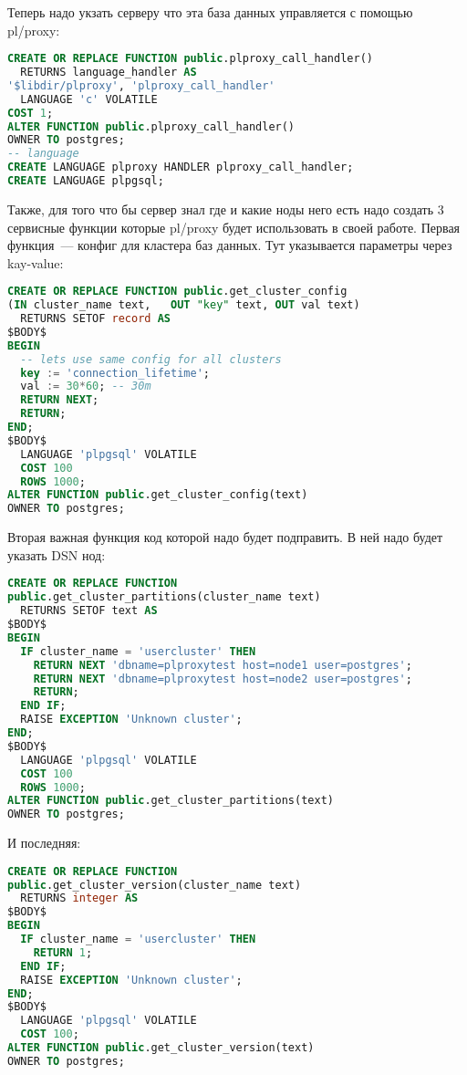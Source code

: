 Теперь надо укзать серверу что эта база данных управляется с помощью pl/proxy:
\begin{lstlisting}[language=SQL,label=lst:plproxy6,caption=Настройка]
CREATE OR REPLACE FUNCTION public.plproxy_call_handler()
  RETURNS language_handler AS
'$libdir/plproxy', 'plproxy_call_handler'
  LANGUAGE 'c' VOLATILE
COST 1;
ALTER FUNCTION public.plproxy_call_handler() 
OWNER TO postgres;
-- language
CREATE LANGUAGE plproxy HANDLER plproxy_call_handler;
CREATE LANGUAGE plpgsql;
\end{lstlisting}

Также, для того что бы сервер знал где и какие ноды него есть надо создать 
3 сервисные функции которые pl/proxy будет использовать в своей работе. 
Первая функция~--- конфиг для кластера баз данных. Тут указывается параметры через kay-value:
\begin{lstlisting}[language=SQL,label=lst:plproxy7,caption=Настройка]
CREATE OR REPLACE FUNCTION public.get_cluster_config
(IN cluster_name text,   OUT "key" text, OUT val text)
  RETURNS SETOF record AS
$BODY$
BEGIN
  -- lets use same config for all clusters
  key := 'connection_lifetime';
  val := 30*60; -- 30m
  RETURN NEXT;
  RETURN;
END;
$BODY$
  LANGUAGE 'plpgsql' VOLATILE
  COST 100
  ROWS 1000;
ALTER FUNCTION public.get_cluster_config(text) 
OWNER TO postgres;  
\end{lstlisting}

Вторая важная функция код которой надо будет подправить. В ней надо будет указать DSN нод:
\begin{lstlisting}[language=SQL,label=lst:plproxy8,caption=Настройка]
CREATE OR REPLACE FUNCTION 
public.get_cluster_partitions(cluster_name text)
  RETURNS SETOF text AS
$BODY$
BEGIN
  IF cluster_name = 'usercluster' THEN
    RETURN NEXT 'dbname=plproxytest host=node1 user=postgres';
    RETURN NEXT 'dbname=plproxytest host=node2 user=postgres';
    RETURN;
  END IF;
  RAISE EXCEPTION 'Unknown cluster';
END;
$BODY$
  LANGUAGE 'plpgsql' VOLATILE
  COST 100
  ROWS 1000;
ALTER FUNCTION public.get_cluster_partitions(text) 
OWNER TO postgres;
\end{lstlisting}

И последняя:
\begin{lstlisting}[language=SQL,label=lst:plproxy9,caption=Настройка]
CREATE OR REPLACE FUNCTION 
public.get_cluster_version(cluster_name text)
  RETURNS integer AS
$BODY$
BEGIN
  IF cluster_name = 'usercluster' THEN
    RETURN 1;
  END IF;
  RAISE EXCEPTION 'Unknown cluster';
END;
$BODY$
  LANGUAGE 'plpgsql' VOLATILE
  COST 100;
ALTER FUNCTION public.get_cluster_version(text) 
OWNER TO postgres;
\end{lstlisting}

